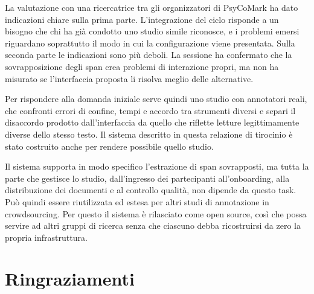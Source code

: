 \documentclass[]{sapthesis}
\begin{document}
La valutazione con una ricercatrice tra gli organizzatori di PsyCoMark ha dato indicazioni chiare sulla prima parte. L'integrazione del ciclo risponde a un bisogno che chi ha già condotto uno studio simile riconosce, e i problemi emersi riguardano soprattutto il modo in cui la configurazione viene presentata. Sulla seconda parte le indicazioni sono più deboli. La sessione ha confermato che la sovrapposizione degli span crea problemi di interazione propri, ma non ha misurato se l'interfaccia proposta li risolva meglio delle alternative.

Per rispondere alla domanda iniziale serve quindi uno studio con annotatori reali, che confronti errori di confine, tempi e accordo tra strumenti diversi e separi il disaccordo prodotto dall'interfaccia da quello che riflette letture legittimamente diverse dello stesso testo. Il sistema descritto in questa relazione di tirocinio è stato costruito anche per rendere possibile quello studio.

Il sistema supporta in modo specifico l'estrazione di span sovrapposti, ma tutta la parte che gestisce lo studio, dall'ingresso dei partecipanti all'onboarding, alla distribuzione dei documenti e al controllo qualità, non dipende da questo task. Può quindi essere riutilizzata ed estesa per altri studi di annotazione in crowdsourcing. Per questo il sistema è rilasciato come open source, così che possa servire ad altri gruppi di ricerca senza che ciascuno debba ricostruirsi da zero la propria infrastruttura.

\printbibliography[heading=bibintoc]

\backmatter

\chapter*{Ringraziamenti}
\end{document}
